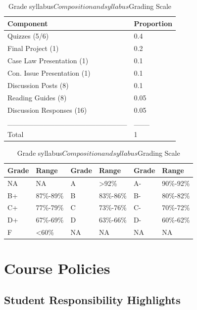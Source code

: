 \documentclass[10pt,]{article}
\begin{document}
\begin{table}[!h]
\caption{\label{tab:unnamed-chunk-2}Grade syllabus$Composition and syllabus$Grading Scale}

\centering
\begin{tabular}[t]{ll}
\toprule
Component & Proportion\\
\midrule
Quizzes (5/6) & 0.4\\
Final Project (1) & 0.2\\
Case Law Presentation (1) & 0.1\\
Con. Issue Presentation (1) & 0.1\\
Discussion Posts (8) & 0.1\\
\addlinespace
Reading Guides (8) & 0.05\\
Discussion Responses (16) & 0.05\\
\_\_\_\_\_\_\_\_\_\_\_\_\_\_\_\_\_\_\_\_\_\_\_ & \_\_\_\\
Total & 1\\
\bottomrule
\end{tabular}
\centering
\begin{tabular}[t]{llllll}
\toprule
Grade & Range & Grade & Range & Grade & Range\\
\midrule
NA & NA & A & >92\% & A- & 90\%-92\%\\
B+ & 87\%-89\% & B & 83\%-86\% & B- & 80\%-82\%\\
C+ & 77\%-79\% & C & 73\%-76\% & C- & 70\%-72\%\\
D+ & 67\%-69\% & D & 63\%-66\% & D- & 60\%-62\%\\
F & <60\% & NA & NA & NA & NA\\
\bottomrule
\end{tabular}
\end{table}

\newpage

\hypertarget{course-policies}{%
\section{Course Policies}\label{course-policies}}

\hypertarget{student-responsibility-highlights}{%
\subsection{Student Responsibility
Highlights}\label{student-responsibility-highlights}}
\end{document}
